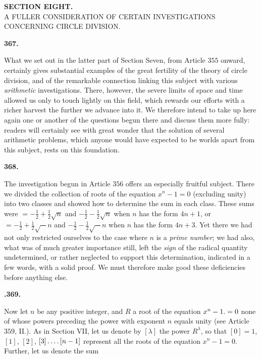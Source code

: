 \clearpage{}
\renewcommand{\BookRunningTitle}{Section Eight.}
\begin{center}
\textbf{SECTION EIGHT.}\\[1em]
A FULLER CONSIDERATION OF CERTAIN INVESTIGATIONS CONCERNING CIRCLE DIVISION.
\end{center}
\par\medskip{}\centerline{\textbf{367.}}\nobreak\smallskip
What we set out in the latter part of Section Seven, from Article $355$ onward, certainly gives substantial examples of the great fertility of the theory of circle division, and of the remarkable connection linking this subject with various \textit{arithmetic} investigations. There, however, the severe limits of space and time allowed us only to touch lightly on this field, which rewards our efforts with a richer harvest the further we advance into it. We therefore intend to take up here again one or another of the questions begun there and discuss them more fully: readers will certainly see with great wonder that the solution of several arithmetic problems, which anyone would have expected to be worlds apart from this subject, rests on this foundation.
\par\medskip{}\centerline{\textbf{368.}}\nobreak\smallskip
The investigation begun in Article $356$ offers an especially fruitful subject. There we divided the collection of roots of the equation $x^n-1=0$ (excluding unity) into two classes and showed how to determine the sum in each class. These sums were $=-\frac12+\frac12\surd n$ and $-\frac12-\frac12\surd n$ when $n$ has the form $4n+1$, or $=-\frac12+\frac12\surd -n$ and $-\frac12-\frac12\surd -n$ when $n$ has the form $4n+3$. Yet there we had not only restricted ourselves to the case where $n$ is a \textit{prime number}; we had also, what was of much greater importance still, left the \textit{sign} of the radical quantity undetermined, or rather neglected to support this determination, indicated in a few words, with a solid proof. We must therefore make good these deficiencies before anything else.
\par\medskip{}\centerline{\textbf{.369.}}\nobreak\smallskip
Now let $n$ be any positive integer, and $R$ a root of the equation $x^n-1\mathbin{.}=0$ none of whose powers preceding the power with exponent $n$ equals unity (see Article $359$, II.). As in Section VII, let us denote by $[\lambda]$ the power $R^\lambda$, so that $[0]=1$, $[1]$, $[2]$, $[3]\mathinner{.\,.\,.\,.}[n-1]$ represent all the roots of the equation $x^n-1=0$. Further, let us denote the sum
